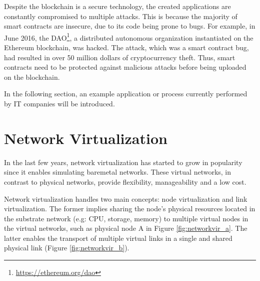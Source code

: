 Despite the blockchain is a secure technology, the created applications are constantly compromised to multiple attacks. This is because the majority of smart contracts are insecure, due to its code being prone to bugs.
For example, in June 2016, the DAO\footnote{\url{https://ethereum.org/dao}}, a distributed autonomous organization instantiated on the Ethereum blockchain, was hacked. The attack, which was a smart contract bug, had resulted in over 50 million dollars of cryptocurrency theft. Thus, smart contracts need to be protected against malicious attacks before being uploaded on the blockchain.

In the following section, an example application or process currently performed by IT companies will be introduced.


\section{Network Virtualization} \label{networkvirtualization}

In the last few years, network virtualization has started to grow in popularity since it enables simulating baremetal networks. These virtual networks, in contrast to physical networks, provide flexibility, manageability and a low cost. 

Network virtualization handles two main concepts: node virtualization and link virtualization. The former implies sharing the node's physical resources located in the substrate network (e.g: CPU, storage, memory) to multiple virtual nodes in the virtual networks, such as physical node A in Figure \ref{fig:networkvir_a}. The latter enables the transport of multiple virtual links in a single and shared physical link (Figure \ref{fig:networkvir_b}).

